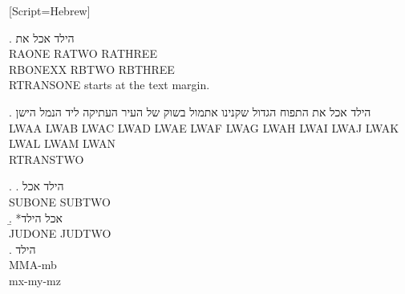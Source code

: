 
\newfontfamily{}[Script=Hebrew]

\GlossRTL

\ex. \glll הילד אכל את \\
           RAONE RATWO RATHREE \\
           RBONEXX RBTWO RBTHREE \\
\glt RTRANSONE starts at the text margin.

\ex. \gll הילד אכל את התפוח הגדול שקנינו אתמול בשוק של העיר העתיקה ליד הנמל הישן \\
          LWAA LWAB LWAC LWAD LWAE LWAF LWAG LWAH LWAI LWAJ LWAK LWAL LWAM LWAN \\
\glt RTRANSTWO

\ex. \a. \gll הילד אכל \\ SUBONE SUBTWO \\
     \b. *\gll אכל הילד \\ JUDONE JUDTWO \\

\GlossMorphAlign
\ex. \glll הילד \\ MMA-mb \\
          mx-my-mz \\
\GlossMorphAlignOff

